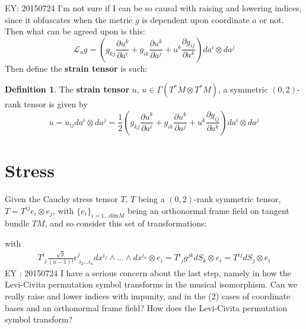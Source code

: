 \documentclass[twoside,landscape,10pt]{amsart}
\theoremstyle{plain}
\theoremstyle{definition}
\newtheorem{definition}{Definition}
\theoremstyle{remark}
\begin{document}
\begin{multicols*}{2}
EY: 20150724 I'm not sure if I can be so causal with raising and lowering indices, since it obfuscates when the metric $g$ is dependent upon coordinate $a$ or not.  Then what can be agreed upon is this:
\begin{equation}\label{Eq:strain00}
  \mathcal{L}_u g= \left( g_{kj} \frac{ \partial u^k}{ \partial a^i } + g_{ik} \frac{ \partial u^k}{ \partial a^j} + u^k \frac{ \partial g_{ij} }{ \partial a^k } \right) da^i \otimes da^j
\end{equation}
Then define the \textbf{strain tensor} is such:
\begin{definition}\label{Def:straintensor}
  The \textbf{strain tensor} $u$, $u \in \Gamma(T^*M\otimes T^*M)$, a symmetric $(0,2)$-rank tensor is given by
\begin{equation}
u = u_{ij} da^i \otimes da^j = \frac{1}{2} \left( g_{kj} \frac{ \partial u^k}{ \partial a^i } + g_{ik} \frac{ \partial u^k}{ \partial a^j} + u^k \frac{ \partial g_{ij} }{ \partial a^k } \right) da^i \otimes da^j
\end{equation}
\end{definition}


\section{Stress}

Given the Cauchy stress tensor $T$, $T$ being a $(0,2)$-rank symmetric tensor, $T = T^{ij} e_i \otimes e_j$, with $\lbrace e_i \rbrace_{i = 1 \dots \text{dim}M}$ being an orthonormal frame field on tangent bundle $TM$, and so consider this set of transformations:

with 
\[
\begin{gathered}
  T^i_{\,\,j}\frac{ \sqrt{g}}{ (n-1)!} \epsilon^j_{\,\,i_2 \dots i_n} dx^{i_2} \wedge \dots \wedge dx^{i_n} \otimes e_i = T^i_{\,\,j} g^{jk}dS_k \otimes e_i = T^{ij} dS_j \otimes e_i
\end{gathered}
\]
EY : 20150724 I have a serious concern about the last step, namely in how the Levi-Civita permutation symbol transforms in the musical isomorphism.  Can we really raise and lower indices with impunity, and in the (2) cases of coordinate bases and an orthonormal frame field? How does the Levi-Civita permutation symbol transform?  


\end{multicols*}
\end{document}
